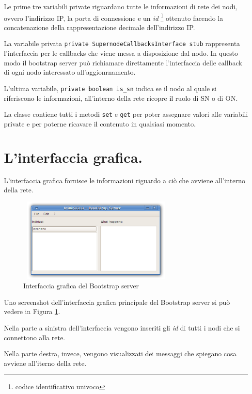 Le prime tre variabili private riguardano tutte le informazioni di rete dei nodi, ovvero l'indirizzo IP,
la porta di connessione e un \emph{id} \footnote{codice identificativo univoco} ottenuto facendo la concatenazione della rappresentazione decimale
dell'indirizzo IP.

La variabile privata \verb|private SupernodeCallbacksInterface stub| rappresenta l'interfaccia per le callbacks che viene messa a disposizione dal nodo. In questo modo il bootstrap server può richiamare direttamente l'interfaccia delle callback di ogni nodo interessato all'aggionrnamento.

L'ultima variabile, \verb|private boolean is_sn| indica se il nodo al quale si riferiscono le informazioni, all'interno della rete ricopre il ruolo di SN o di ON.

La classe contiene tutti i metodi \verb|set| e \verb|get| per poter assegnare valori alle variabili private e per poterne ricavare il contenuto in qualsiasi momento.

\section{L'interfaccia grafica.}
L'interfaccia grafica fornisce le informazioni riguardo a ciò che avviene all'interno della rete.

\begin{figure}[t]
 \centering
 \includegraphics[width=300px,height=160px]{images/bss_grafica.eps}
 \caption{Interfaccia grafica del Bootstrap server}
 \label{fig:bss_grafica}
\end{figure}

Uno screenshot dell'interfaccia grafica principale del Bootstrap server si può vedere in Figura \ref{fig:bss_grafica}.

Nella parte a sinistra dell'interfaccia vengono inseriti gli \emph{id} di tutti i nodi che si connettono alla rete.

Nella parte destra, invece, vengono visualizzati dei messaggi che spiegano cosa avviene all'iterno della rete.



